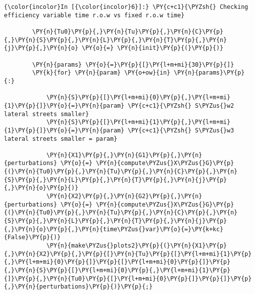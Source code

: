     \begin{Verbatim}[commandchars=\\\{\}]
{\color{incolor}In [{\color{incolor}6}]:} \PY{c+c1}{\PYZsh{} Checking efficiency variable time r.o.w vs fixed r.o.w time}
        
        \PY{n}{Tu0}\PY{p}{,}\PY{n}{Tu}\PY{p}{,}\PY{n}{C}\PY{p}{,}\PY{n}{S}\PY{p}{,}\PY{n}{L}\PY{p}{,}\PY{n}{T}\PY{p}{,}\PY{n}{j}\PY{p}{,}\PY{n}{o} \PY{o}{=} \PY{n}{init}\PY{p}{(}\PY{p}{)}
        
        \PY{n}{params} \PY{o}{=}\PY{p}{[}\PY{l+m+mi}{30}\PY{p}{]}
        \PY{k}{for} \PY{n}{param} \PY{o+ow}{in} \PY{n}{params}\PY{p}{:}
            
            \PY{n}{S}\PY{p}{[}\PY{l+m+mi}{0}\PY{p}{,}\PY{l+m+mi}{1}\PY{p}{]}\PY{o}{=}\PY{n}{param} \PY{c+c1}{\PYZsh{} S\PYZus{}w2 lateral streets smaller}
            \PY{n}{S}\PY{p}{[}\PY{l+m+mi}{1}\PY{p}{,}\PY{l+m+mi}{1}\PY{p}{]}\PY{o}{=}\PY{n}{param} \PY{c+c1}{\PYZsh{} S\PYZus{}w3 lateral streets smaller = param}
            
            \PY{n}{X1}\PY{p}{,}\PY{n}{G1}\PY{p}{,}\PY{n}{perturbations} \PY{o}{=} \PY{n}{compute\PYZus{}X\PYZus{}G}\PY{p}{(}\PY{n}{Tu0}\PY{p}{,}\PY{n}{Tu}\PY{p}{,}\PY{n}{C}\PY{p}{,}\PY{n}{S}\PY{p}{,}\PY{n}{L}\PY{p}{,}\PY{n}{T}\PY{p}{,}\PY{n}{j}\PY{p}{,}\PY{n}{o}\PY{p}{)}
            \PY{n}{X2}\PY{p}{,}\PY{n}{G2}\PY{p}{,}\PY{n}{perturbations} \PY{o}{=} \PY{n}{compute\PYZus{}X\PYZus{}G}\PY{p}{(}\PY{n}{Tu0}\PY{p}{,}\PY{n}{Tu}\PY{p}{,}\PY{n}{C}\PY{p}{,}\PY{n}{S}\PY{p}{,}\PY{n}{L}\PY{p}{,}\PY{n}{T}\PY{p}{,}\PY{n}{j}\PY{p}{,}\PY{n}{o}\PY{p}{,}\PY{n}{time\PYZus{}var}\PY{o}{=}\PY{k+kc}{False}\PY{p}{)}
            \PY{n}{make\PYZus{}plots2}\PY{p}{(}\PY{n}{X1}\PY{p}{,}\PY{n}{X2}\PY{p}{,}\PY{p}{[}\PY{n}{Tu}\PY{p}{[}\PY{l+m+mi}{1}\PY{p}{,}\PY{l+m+mi}{0}\PY{p}{]}\PY{p}{[}\PY{l+m+mi}{0}\PY{p}{]}\PY{p}{,}\PY{n}{S}\PY{p}{[}\PY{l+m+mi}{0}\PY{p}{,}\PY{l+m+mi}{1}\PY{p}{]}\PY{p}{,}\PY{n}{Tu0}\PY{p}{[}\PY{l+m+mi}{0}\PY{p}{]}\PY{p}{]}\PY{p}{,}\PY{n}{perturbations}\PY{p}{)}\PY{p}{;}
\end{Verbatim}

    
    
